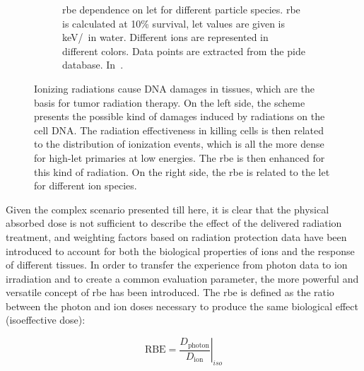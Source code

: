 \begin{figure}
\begin{subfigure}[t]{.58\textwidth}
\caption{\gls{rbe} dependence on \gls{let} for different particle species. \gls{rbe} is calculated at 10\% survival, \gls{let} values are given is keV/\charmum  ~in water. Different ions are represented in different colors. Data points are extracted from the \gls{pide} database. In~\cite{Durante2016}.}
\label{chap1::fig::rbelet}
\end{subfigure}
\caption{Ionizing radiations cause DNA damages in tissues, which are the basis for tumor radiation therapy. On the left side, the scheme presents the possible kind of damages induced by radiations on the cell DNA. The radiation effectiveness in killing cells is then related to the distribution of ionization events, which is all the more dense for high-\gls{let} primaries at low energies. The \gls{rbe} is then enhanced for this kind of radiation. On the right side, the \gls{rbe} is related to the \gls{let} for different ion species.}
\label{chap1::fig::NuclearInt}
\end{figure}
     
Given the complex scenario presented till here, it is clear that the physical absorbed dose is not sufficient to describe the effect of the delivered radiation treatment, and weighting factors based on radiation protection data have been introduced to account for both the biological properties of ions and the response of different tissues. In order to transfer the experience from photon data to ion irradiation and to create a common evaluation parameter, the more powerful and versatile concept of \gls{rbe} has been introduced. The \gls{rbe} is defined as the ratio between the photon and ion doses necessary to produce the same biological effect (isoeffective dose):

\begin{equation}
\left. \mathrm{RBE} = \frac{D_{\mathrm{photon}}}{D_{\mathrm{ion}}}\right|_{iso}
\label{chap1::eq::rbeDef}
\end{equation}

